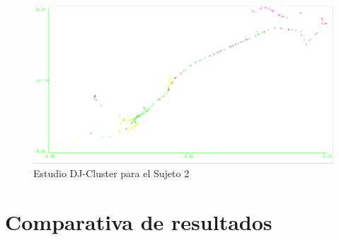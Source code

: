\documentclass[a4paper, 12pt]{article}
\begin{document}
\begin{figure}[H]
	\includegraphics[scale=.5]{../comparativa/djClusterSujeto2.png}
	\caption{Estudio DJ-Cluster para el Sujeto 2}
\end{figure}


\pagebreak
\section{Comparativa de resultados}
\end{document}
